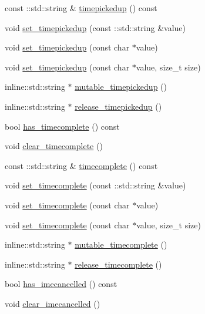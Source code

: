 \begin{DoxyCompactItemize}
const \-::std\-::string \& \hyperlink{classPatronInfo_a921654c3f210e1604583e9c6f7c75088}{timepickedup} () const 
\item 
void \hyperlink{classPatronInfo_afb1e2e42e9e05bf6f83efe578fb896f9}{set\-\_\-timepickedup} (const \-::std\-::string \&value)
\item 
void \hyperlink{classPatronInfo_a66c2f87a4ff4007b5f285c6f23144fc2}{set\-\_\-timepickedup} (const char $\ast$value)
\item 
void \hyperlink{classPatronInfo_a38d46ce19c5e677b90e36c1ef0687c12}{set\-\_\-timepickedup} (const char $\ast$value, size\-\_\-t size)
\item 
inline\-::std\-::string $\ast$ \hyperlink{classPatronInfo_a18c67f2aa00fb991c242471b24bcddfb}{mutable\-\_\-timepickedup} ()
\item 
inline\-::std\-::string $\ast$ \hyperlink{classPatronInfo_ac583e393d9b69e8aea297858dd5ea9e2}{release\-\_\-timepickedup} ()
\item 
bool \hyperlink{classPatronInfo_a622102768891afe4e104454300ae8070}{has\-\_\-timecomplete} () const 
\item 
void \hyperlink{classPatronInfo_a2005e4dd12f0d8b176c1a5fb5e5bb8a4}{clear\-\_\-timecomplete} ()
\item 
const \-::std\-::string \& \hyperlink{classPatronInfo_a89033061d186586905f5d0945c806f0c}{timecomplete} () const 
\item 
void \hyperlink{classPatronInfo_a9f1eadea86383057c1399c55049001a4}{set\-\_\-timecomplete} (const \-::std\-::string \&value)
\item 
void \hyperlink{classPatronInfo_a1a5cafa2ce339299b634f64d8d8498a5}{set\-\_\-timecomplete} (const char $\ast$value)
\item 
void \hyperlink{classPatronInfo_ac7d43a5631f9113f2d37eef8c8504a1d}{set\-\_\-timecomplete} (const char $\ast$value, size\-\_\-t size)
\item 
inline\-::std\-::string $\ast$ \hyperlink{classPatronInfo_a5756629cef0c60f0a59792b562048334}{mutable\-\_\-timecomplete} ()
\item 
inline\-::std\-::string $\ast$ \hyperlink{classPatronInfo_a62f48895efe5ec33e63ebd65df00c4a1}{release\-\_\-timecomplete} ()
\item 
bool \hyperlink{classPatronInfo_a058ef889f088db936af634396548db4e}{has\-\_\-imecancelled} () const 
\item 
void \hyperlink{classPatronInfo_a27b4bd6338ab7b708de95cd5259310ae}{clear\-\_\-imecancelled} ()
\item 

\end{DoxyCompactItemize}
